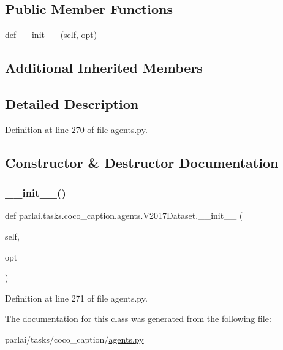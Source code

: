 \subsection*{Public Member Functions}
\begin{DoxyCompactItemize}
\item 
def \hyperlink{classparlai_1_1tasks_1_1coco__caption_1_1agents_1_1V2017Dataset_a7469de10b2d6e7c7563e3bf713cd216e}{\+\_\+\+\_\+init\+\_\+\+\_\+} (self, \hyperlink{classparlai_1_1tasks_1_1coco__caption_1_1agents_1_1DefaultDataset_adaa89b61b63ef4c1291774fda7abaf3c}{opt})
\end{DoxyCompactItemize}
\subsection*{Additional Inherited Members}


\subsection{Detailed Description}


Definition at line 270 of file agents.\+py.



\subsection{Constructor \& Destructor Documentation}
\mbox{\label{classparlai_1_1tasks_1_1coco__caption_1_1agents_1_1V2017Dataset_a7469de10b2d6e7c7563e3bf713cd216e}} 
\subsubsection{\texorpdfstring{\+\_\+\+\_\+init\+\_\+\+\_\+()}{\_\_init\_\_()}}
{\footnotesize\ttfamily def parlai.\+tasks.\+coco\+\_\+caption.\+agents.\+V2017\+Dataset.\+\_\+\+\_\+init\+\_\+\+\_\+ (\begin{DoxyParamCaption}\item[{}]{self,  }\item[{}]{opt }\end{DoxyParamCaption})}



Definition at line 271 of file agents.\+py.



The documentation for this class was generated from the following file\+:\begin{DoxyCompactItemize}
\item 
parlai/tasks/coco\+\_\+caption/\hyperlink{parlai_2tasks_2coco__caption_2agents_8py}{agents.\+py}\end{DoxyCompactItemize}

